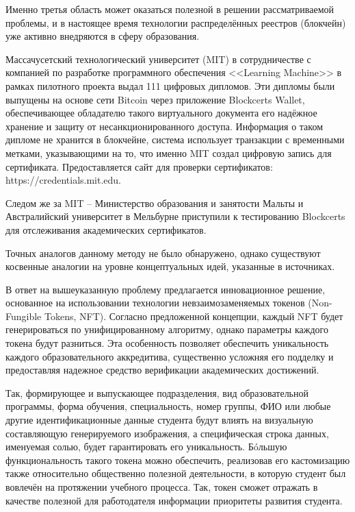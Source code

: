 \documentclass{mirea-article}
\begin{document}
Именно третья область может оказаться полезной в решении рассматриваемой проблемы, и в настоящее время технологии распределённых реестров (блокчейн) уже активно внедряются в сферу образования.~\cite{bib:blokchejn-v-obrazovanii, bib:blokcheyn-v-uchebnom-protsesse}

Массачусетский технологический университет (MIT) в сотрудничестве с компанией по разработке программного обеспечения <<Learning Machine>> в рамках пилотного проекта выдал 111 цифровых дипломов. Эти дипломы были выпущены на основе сети Bitcoin через приложение Blockcerts Wallet, обеспечивающее обладателю такого виртуального документа его надёжное хранение и защиту от несанкционированного доступа. Информация о таком дипломе не хранится в блокчейне, система использует транзакции с временными метками, указывающими на то, что именно MIT создал цифровую запись для сертификата. Предоставляется сайт для проверки сертификатов: https://credentials.mit.edu.

Следом же за MIT – Министерство образования и занятости Мальты и Австралийский университет в Мельбурне приступили к тестированию Blockcerts для отслеживания академических сертификатов.

Точных аналогов данному методу не было обнаружено, однако существуют косвенные аналогии на уровне концептуальных идей, указанные в источниках.

В ответ на вышеуказанную проблему предлагается инновационное решение, основанное на использовании технологии невзаимозаменяемых токенов (Non-Fungible Tokens, NFT). Согласно предложенной концепции, каждый NFT будет генерироваться по унифицированному алгоритму, однако параметры каждого токена будут разниться. Эта особенность позволяет обеспечить уникальность каждого образовательного аккредитива, существенно усложняя его подделку и предоставляя надежное средство верификации академических достижений.

Так, формирующее и выпускающее подразделения, вид образовательной программы, форма обучения, специальность, номер группы, ФИО или любые другие идентификационные данные студента будут влиять на визуальную составляющую генерируемого изображения, а специфическая строка данных, именуемая солью, будет гарантировать его уникальность. Бóльшую функциональность такого токена можно обеспечить, реализовав его кастомизацию также относительно общественно полезной деятельности, в которую студент был вовлечён на протяжении учебного процесса. Так, токен сможет отражать в качестве полезной для работодателя информации приоритеты развития студента.
\end{document}
